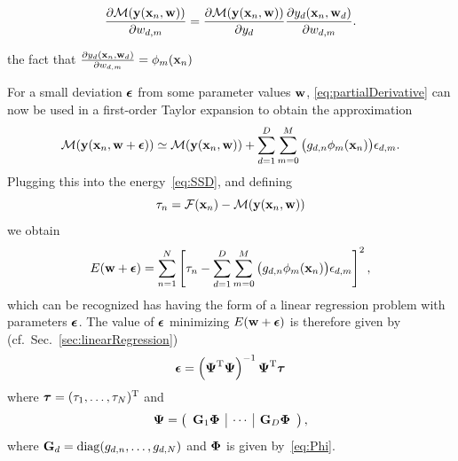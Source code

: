 \documentclass[10pt,twoside]{book}
\begin{document}
$$
\frac{\partial \mathcal{M}( \mathbf{y}( \mathbf{x}_n, \mathbf{w} ) )}{\partial w_{d,m}}
=
\frac{\partial \mathcal{M}( \mathbf{y}( \mathbf{x}_n, \mathbf{w} ) )}{\partial y_d}
\frac{\partial y_d( \mathbf{x}_n, \mathbf{w}_d )}{\partial w_{d,m}}
.
$$

the fact that $\frac{\partial y_d( \mathbf{x}_n, \mathbf{w}_d )}{\partial w_{d,m}} = \phi_m( \mathbf{x}_n )$
\fi

For a small deviation ${\mbox{\boldmath {${\epsilon}$}}}$ from some parameter values $\mathbf{w}$, 
\eqref{eq:partialDerivative} can now be used in a first-order Taylor expansion to obtain the approximation
\begin{equation}
\mathcal{M}( \mathbf{y}( \mathbf{x}_n, \mathbf{w}+{\mbox{\boldmath {${\epsilon}$}}} ) ) 
\simeq
\mathcal{M}( \mathbf{y}( \mathbf{x}_n, \mathbf{w} ) ) 
+ 
\sum_{d=1}^D \sum_{m=0}^M \big( g_{d,n} \phi_m( \mathbf{x}_n ) \big) \epsilon_{d,m}
.
\label{eq:taylor}
\end{equation}
Plugging this into the energy~\eqref{eq:SSD},
and defining 
$$
\tau_n = \mathcal{F}( \mathbf{x}_n ) - \mathcal{M}( \mathbf{y}( \mathbf{x}_n, \mathbf{w} ) )
$$
we obtain
$$
E( \mathbf{w} + {\mbox{\boldmath {${\epsilon}$}}} )
= 
\sum_{n=1}^N
\left[
\tau_n - \sum_{d=1}^D \sum_{m=0}^M \big( g_{d,n} \phi_m( \mathbf{x}_n ) \big) \epsilon_{d,m}
\right]^2
,
$$
which can be recognized has having the form of a linear regression problem with parameters 
${\mbox{\boldmath {${\epsilon}$}}}$.
The value of ${\mbox{\boldmath {${\epsilon}$}}}$ minimizing $E(\mathbf{w} + {\mbox{\boldmath {${\epsilon}$}}})$
is therefore given by (cf.~Sec.~\ref{sec:linearRegression})
\begin{equation}
{\mbox{\boldmath {${\epsilon}$}}}
=
\left( 
{\mbox{\boldmath {${\Psi}$}}}^\mathrm{T} {\mbox{\boldmath {${\Psi}$}}}
\right)^{-1}
{\mbox{\boldmath {${\Psi}$}}}^\mathrm{T}
{\mbox{\boldmath {${\tau}$}}}
\label{eq:GaussNewton}
\end{equation}
where 
$
{\mbox{\boldmath {${\tau}$}}} = (\tau_1, \ldots, \tau_N)^\mathrm{T}
$
and 
$$
{\mbox{\boldmath {${\Psi}$}}} =
\left(
\begin{array}{c|c|c}
\mathbf{G}_1 {\mbox{\boldmath {${\Phi}$}}}
&
\cdots 
&
\mathbf{G}_D {\mbox{\boldmath {${\Phi}$}}}
\end{array}
\right)
,
$$
where 
$\mathbf{G}_d = \mathrm{diag}( g_{d,n}, \ldots, g_{d,N} )$
and 
${\mbox{\boldmath {${\Phi}$}}}$ is given by~\eqref{eq:Phi}.
\end{document}
